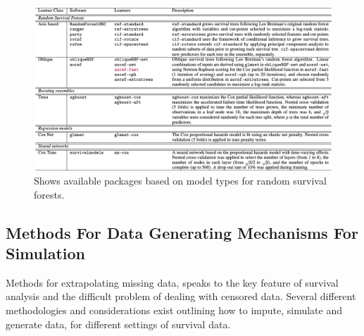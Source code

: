 \begin{figure}
	\includegraphics[scale=0.42]{Figures/OBLIQUE_SUMMARY.png}
	\caption{\parencite{jaeger_accelerated_2022} Shows available packages based on model types for random survival forests.}
\end{figure}

\subsection{Methods For Data Generating Mechanisms For Simulation}
\noindent Methods for extrapolating missing data, speaks to the key feature of survival analysis and the difficult problem of dealing with censored data. Several different methodologies and considerations exist outlining how to impute, simulate and generate data, for different settings of survival data.
